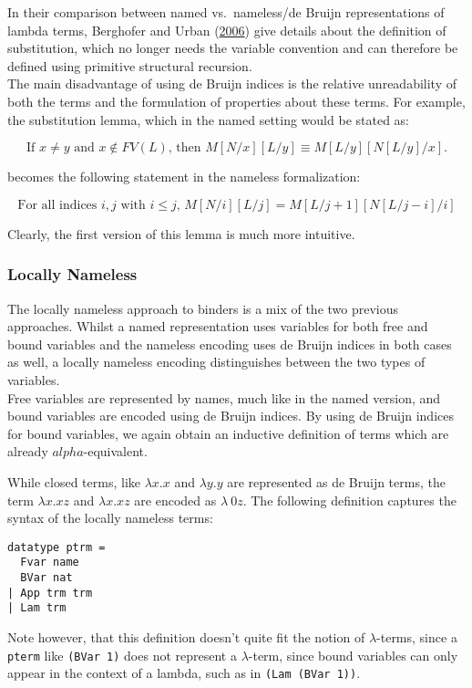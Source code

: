 \documentclass[a4paper, 12pt, twoside]{style/ociamthesis}
\let\OldTexttt\texttt
\renewcommand{\texttt}[1]{\small\OldTexttt{#1}}
\begin{document}
In their comparison between named vs.~nameless/de Bruijn representations
of lambda terms, Berghofer and Urban
(\protect\hyperlink{ref-berghofer06}{2006}) give details about the
definition of substitution, which no longer needs the variable
convention and can therefore be defined using primitive structural
recursion.\\
The main disadvantage of using de Bruijn indices is the relative
unreadability of both the terms and the formulation of properties about
these terms. For example, the substitution lemma, which in the named
setting would be stated as:

\[\text{If }x \neq y\text{ and }x \not\in FV(L)\text{, then }
M[N/x][L/y] \equiv M[L/y][N[L/y]/x].\]

becomes the following statement in the nameless formalization:

\[\text{For all indices }i, j\text{ with }i \leq j\text{, }M[N/i][L/j] = M[L/j + 1][N[L/j - i]/i]\]

Clearly, the first version of this lemma is much more intuitive.

\subsubsection{Locally Nameless}\label{locally-nameless}

The locally nameless approach to binders is a mix of the two previous
approaches. Whilst a named representation uses variables for both free
and bound variables and the nameless encoding uses de Bruijn indices in
both cases as well, a locally nameless encoding distinguishes between
the two types of variables.\\
Free variables are represented by names, much like in the named version,
and bound variables are encoded using de Bruijn indices. By using de
Bruijn indices for bound variables, we again obtain an inductive
definition of terms which are already \(alpha\)-equivalent.

While closed terms, like \(\lambda x.x\) and \(\lambda y.y\) are
represented as de Bruijn terms, the term \(\lambda x.xz\) and
\(\lambda x.xz\) are encoded as \(\lambda\ 0z\). The following
definition captures the syntax of the locally nameless terms:

\begin{verbatim}
datatype ptrm =
  Fvar name
  BVar nat
| App trm trm
| Lam trm
\end{verbatim}

Note however, that this definition doesn't quite fit the notion of
\(\lambda\)-terms, since a \texttt{pterm} like \texttt{(BVar 1)} does
not represent a \(\lambda\)-term, since bound variables can only appear
in the context of a lambda, such as in \texttt{(Lam (BVar 1))}.
\end{document}
